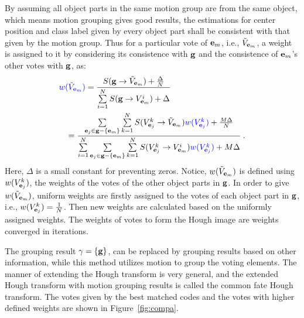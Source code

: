 By assuming all object parts in the same motion group are from the same object, which means motion grouping gives good results, the estimations for center position and class label given by every object part shall be consistent with that given by the motion group.
Thus for a particular vote of ${\bf{e}}_m$, i.e., ${\tilde{V}}_{{\bf{e}}_m}$, a weight is assigned to it by considering its consistence with $\bf{g}$ and the consistence of ${\bf{e}}_m$'s other votes  with $\bf{g}$, as:
\begin{equation}
\begin{aligned}
{\color{blue}w(}&{\color{blue}{\tilde{V}}_{{\bf{e}}_m})}
= \frac
{S({\bf{g}} \to {{\tilde{V}}_{{\bf{e}}_m}}) + \frac{\Delta } N}
{\sum\limits^N_{i=1}{ S({\bf{g}} \to {V^i_{{{\bf{e}}_m}}})} + \Delta }\\
&
\begin{aligned}
= \frac
{ \sum\limits_{{{\bf{e}}_j} \in {\bf{g}}- \{ {{\bf{e}}_m} \}} {
\sum\limits^N_{k=1} {S({{V^k_{{{\bf{e}}_j}}} \to {{\tilde{V}}_{{{\bf{e}}_m}}}})\color{blue}{w(V^k_{{\bf{e}}_j})}}
}  + \frac{M\Delta } N}
{\sum\limits^N_{i=1}{
\sum\limits_{{{\bf{e}}_j} \in {\bf{g}}- \{ {{\bf{e}}_m} \}} {
\sum\limits^N_{k=1} {S({{V^k_{{{\bf{e}}_j}}} \to {V^i_{{{\bf{e}}_m}}}})\color{blue}{w(V^k_{{\bf{e}}_j})}}
}
} + M\Delta }\:.
\end{aligned}
\end{aligned}
\label{eq4}
\end{equation}
Here, $\Delta$ is a small constant for preventing zeros. Notice, $w({\tilde{V}}_{{\bf{e}}_m})$ is defined using $w(V^k_{{\bf{e}}_j})$, the weights of the votes of the other object parts in ${\bf{g}}$. In order to give $w({\tilde{V}}_{{\bf{e}}_m})$, uniform weights are firstly assigned to the votes of each object part in ${\bf{g}}$, i.e., $w(V^k_{{\bf{e}}_j})=\frac{1}{N}$. Then new weights are calculated based on the uniformly assigned weights. The weights of votes to form the Hough image are weights converged in iterations.

The grouping result $\gamma=\{\bf{g}\}$, can be replaced by grouping results based on other information, while this method utilizes motion to group the voting elements. The manner of extending the Hough transform is very general, and the extended Hough transform with motion grouping results is called the common fate Hough transform. The votes given by the best matched codes and the votes with higher defined weights are shown in Figure~\ref{fig:compa}.

